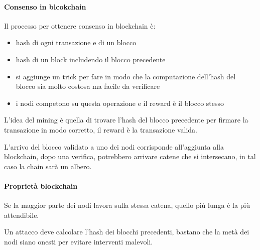 \paragraph{Consenso in blcokchain}
Il processo per ottenere consenso in blockchain è:
\begin{itemize}
    \item hash di ogni transazione e di un blocco
    \item hash di un block includendo il blocco precedente
    \item si aggiunge un trick per fare in modo che la computazione 
    dell'hash del blocco sia molto costosa ma facile da verificare
    \item i nodi competono su questa operazione e il reward è 
    il blocco stesso 
\end{itemize} 
L'idea del mining è quella di trovare l'hash del blocco precedente 
per firmare la transazione in modo corretto, il reward è la transazione valida.

L'arrivo del blocco validato a uno dei nodi corrisponde all'aggiunta 
alla blockchain, dopo una verifica, potrebbero arrivare catene che si intersecano, 
in tal caso la chain sarà un albero.

\paragraph{Proprietà blockchain}
Se la maggior parte dei nodi lavora sulla stessa catena, quello più lunga è la più
attendibile. 

Un attacco deve calcolare l'hash dei blocchi precedenti, bastano che la metà
dei nodi siano onesti per evitare interventi malevoli.

